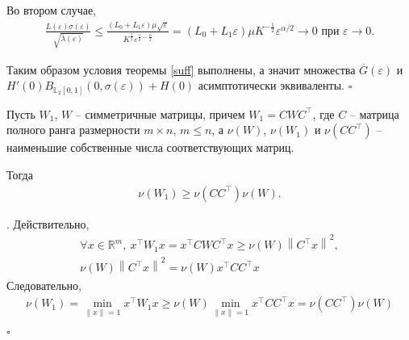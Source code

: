 \documentclass[../main.tex]{subfiles}
\begin{document}
    Во втором случае,
    \begin{gather*}
        \frac{L(\varepsilon) \sigma(\varepsilon)}{\sqrt{\overline{\lambda}(\varepsilon)}} 
        \leqslant
        \frac{(L_0+L_1\varepsilon)\mu\sqrt{\varepsilon}}{{K^{\frac{1}{2}}}\varepsilon^{\frac{1}{2}-\frac{\alpha}{2}}}
        =
        (L_0+L_1\varepsilon)\mu K^{-\frac{1}{2}}\varepsilon^{\alpha/2} \rightarrow 0 \mbox{\ при\ } \varepsilon \rightarrow 0.
    \end{gather*}
    
    Таким образом условия теоремы \ref{suff} выполнены, а значит множества $ \overline{G}(\varepsilon) $ и \\$ H'(0)B_{\mathbb{L}_2[0,1]}(0,\sigma(\varepsilon))+ H(0) $ асимптотически эквиваленты.
    \hfill $\square$
    \begin{utv}
        Пусть $ W_1 $, $ W $ -- симметричные матрицы, причем $ W_1 = C W C^{\top} $, где $ C $ -- матрица  полного ранга размерности $ m \times n $, $ m \leqslant n $, а $ \nu(W) $, $ \nu(W_1) $ и $ \nu(CC^{\top}) $ -- наименьшие собственные числа соответствующих матриц.
        
        Тогда
        \begin{gather*}
            \nu(W_1) \geqslant \nu(CC^{\top})  \nu(W).
        \end{gather*}
    \end{utv}
    \doc. 
    Действительно,
    \begin{gather*}
        \forall x \in \mathbb{R}^m, \: x^{\top} W_1 x = x^{\top} C W C^{\top} x \geqslant \nu(W)\left\| C^{\top}x \right\| ^2,\\
        \nu(W)\left\| C^{\top}x \right\| ^2 = \nu(W) x^{\top} C C^{\top} x
    \end{gather*}
    Следовательно,
    \begin{gather*}
        \nu(W_1) = \min \limits_{\left\| x\right\| =1}x^{\top}W_1x \geqslant \nu(W)\min \limits_{\left\| x\right\| =1}x^{\top}CC^{\top}x = \nu(CC^{\top})  \nu(W) 
    \end{gather*} \begin{flushright}
        \hfill $ \square $
    \end{flushright}
    
\end{document}
